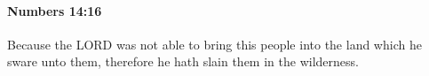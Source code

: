 
		\paragraph{Numbers 14:16} %
			\label{NUMBERS-14-16}

			Because the LORD was not able to bring this people into the land which he sware unto them, therefore he hath slain them in the wilderness.


